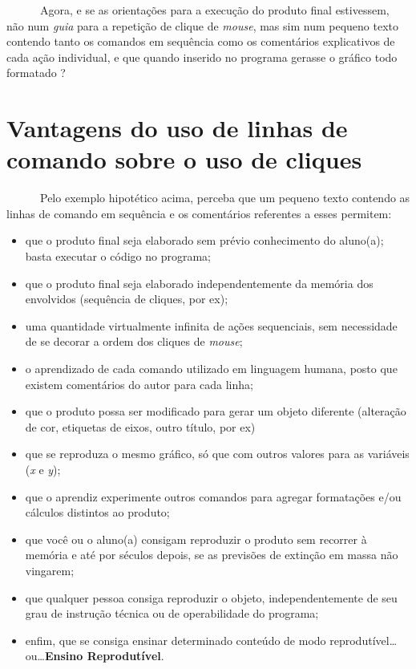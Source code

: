\documentclass[
  letterpaper,
  DIV=11,
  numbers=noendperiod]{scrreprt}
\providecommand{\tightlist}{%
  \setlength{\itemsep}{0pt}\setlength{\parskip}{0pt}}\usepackage{longtable,booktabs,array}
\begin{document}
~~~~~~Agora, e se as orientações para a execução do produto final
estivessem, não num \emph{guia} para a repetição de clique de
\emph{mouse}, mas sim num pequeno texto contendo tanto os comandos em
sequência como os comentários explicativos de cada ação individual, e
que quando inserido no programa gerasse o gráfico todo formatado ?

\section{Vantagens do uso de linhas de comando sobre o uso de
cliques}\label{vantagens-do-uso-de-linhas-de-comando-sobre-o-uso-de-cliques}

~~~~~~Pelo exemplo hipotético acima, perceba que um pequeno texto
contendo as linhas de comando em sequência e os comentários referentes a
esses permitem:

\begin{itemize}
\tightlist
\item
  que o produto final seja elaborado sem prévio conhecimento do
  aluno(a); basta executar o código no programa;
\item
  que o produto final seja elaborado independentemente da memória dos
  envolvidos (sequência de cliques, por ex);
\item
  uma quantidade virtualmente infinita de ações sequenciais, sem
  necessidade de se decorar a ordem dos cliques de \emph{mouse};
\item
  o aprendizado de cada comando utilizado em linguagem humana, posto que
  existem comentários do autor para cada linha;
\item
  que o produto possa ser modificado para gerar um objeto diferente
  (alteração de cor, etiquetas de eixos, outro título, por ex)
\item
  que se reproduza o mesmo gráfico, só que com outros valores para as
  variáveis (\emph{x} e \emph{y});
\item
  que o aprendiz experimente outros comandos para agregar formatações
  e/ou cálculos distintos ao produto;
\item
  que você ou o aluno(a) consigam reproduzir o produto sem recorrer à
  memória e até por séculos depois, se as previsões de extinção em massa
  não vingarem;
\item
  que qualquer pessoa consiga reproduzir o objeto, independentemente de
  seu grau de instrução técnica ou de operabilidade do programa;
\item
  enfim, que se consiga ensinar determinado conteúdo de modo
  reprodutível\ldots ou\ldots{}\textbf{Ensino Reprodutível}.
\end{itemize}
\end{document}
